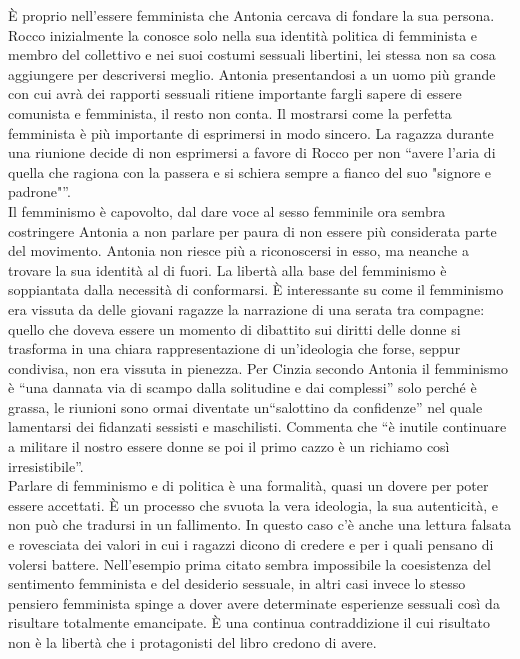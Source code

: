 È proprio nell'essere femminista che Antonia cercava di fondare la sua persona.
Rocco inizialmente la conosce solo nella sua identità politica di femminista e membro del collettivo e nei suoi costumi sessuali libertini, lei stessa non sa cosa aggiungere per descriversi meglio.
Antonia presentandosi a un uomo più grande con cui avrà dei rapporti sessuali ritiene importante fargli sapere di essere comunista e femminista, il resto non conta.
Il mostrarsi come la perfetta femminista è più importante di esprimersi in modo sincero.
La ragazza durante una riunione decide di non esprimersi a favore di Rocco per non \enquote{avere l'aria di quella che ragiona con la passera e si schiera sempre a fianco del suo "signore e padrone"}.
\\Il femminismo è capovolto, dal dare voce al sesso femminile ora sembra costringere Antonia a non parlare per paura di non essere più considerata parte del movimento.
Antonia non riesce più a riconoscersi in esso, ma neanche a trovare la sua identità al di fuori.
La libertà alla base del femminismo è soppiantata dalla necessità di conformarsi.
È interessante su come il femminismo era vissuta da delle giovani ragazze la narrazione di una serata tra compagne: quello che doveva essere un momento di dibattito sui diritti delle donne si trasforma in una chiara rappresentazione di un'ideologia che forse, seppur condivisa, non era vissuta in pienezza.
Per Cinzia secondo Antonia il femminismo è \enquote{una dannata via di scampo dalla solitudine e dai complessi} solo perché è grassa, le riunioni sono ormai diventate un\enquote{salottino da confidenze} nel quale lamentarsi dei fidanzati sessisti e maschilisti.
Commenta che \enquote{è inutile continuare a militare il nostro essere donne se poi il primo cazzo è un richiamo così irresistibile}.
\\Parlare di femminismo e di politica è una formalità, quasi un dovere per poter essere accettati.
È un processo che svuota la vera ideologia, la sua autenticità, e non può che tradursi in un fallimento.
In questo caso c'è anche una lettura falsata e rovesciata dei valori in cui i ragazzi dicono di credere e per i quali pensano di volersi battere.
Nell'esempio prima citato sembra impossibile la coesistenza del sentimento femminista e del desiderio sessuale, in altri casi invece lo stesso pensiero femminista spinge a dover avere determinate esperienze sessuali così da risultare totalmente emancipate.
È una continua contraddizione il cui risultato non è la libertà che i protagonisti del libro credono di avere.

